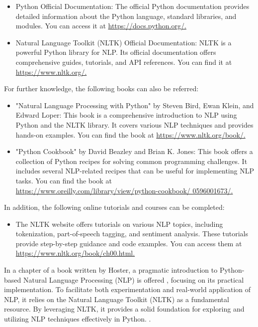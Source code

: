 \begin{itemize}
    \item Python Official Documentation: The official Python documentation provides detailed information about the Python language, standard libraries, and modules. You can access it at \url{ https://docs.python.org/.}
    \item Natural Language Toolkit (NLTK) Official Documentation: NLTK is a powerful Python library for NLP. Its official documentation offers comprehensive guides, tutorials, and API references. You can find it at \url{https://www.nltk.org/.}
\end{itemize}

For further knowledge, the following books can also be referred:

\begin{itemize}
    \item "Natural Language Processing with Python" by Steven Bird, Ewan Klein, and Edward Loper: This book is a comprehensive introduction to NLP using Python and the NLTK library. It covers various NLP techniques and provides hands-on examples. You can find the book at \url{https://www.nltk.org/book/.}
    \item "Python Cookbook" by David Beazley and Brian K. Jones: This book offers a collection of Python recipes for solving common programming challenges. It includes several NLP-related recipes that can be useful for implementing NLP tasks. You can find the book at \hfill \url{https://www.oreilly.com/library/view/python-cookbook/ 0596001673/.}
\end{itemize}

In addition, the following online tutorials and courses can be completed:
\begin{itemize}
    \item The NLTK website offers tutorials on various NLP topics, including tokenization, part-of-speech tagging, and sentiment analysis. These tutorials provide step-by-step guidance and code examples. You can access them at \url{https://www.nltk.org/book/ch00.html.}
\end{itemize}


In a chapter of a book written by Hoster, a pragmatic introduction to  Python-based Natural Language Processing (NLP) is offered , focusing on its practical implementation. To facilitate both experimentation and real-world application of NLP, it relies on the Natural Language Toolkit (NLTK) as a fundamental resource. By leveraging NLTK, it provides a solid foundation for exploring and utilizing NLP techniques effectively in Python. \cite{Hosmer:2014}.

